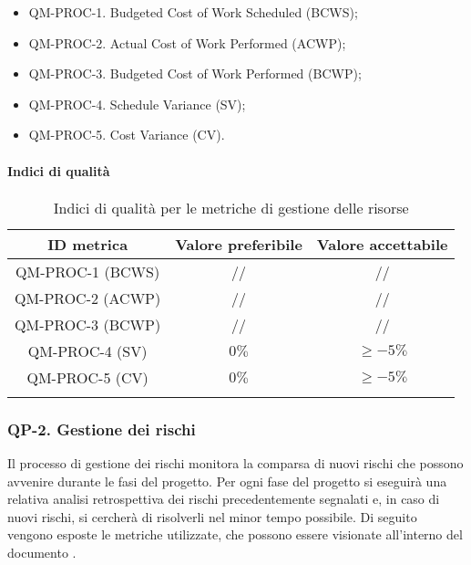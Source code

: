 			\begin{itemize}
				\item QM-PROC-1. Budgeted Cost of Work Scheduled (BCWS);
				\item QM-PROC-2. Actual Cost of Work Performed (ACWP);
				\item QM-PROC-3. Budgeted Cost of Work Performed (BCWP);
				\item QM-PROC-4. Schedule Variance (SV);
				\item QM-PROC-5. Cost Variance (CV).
			\end{itemize}

		\paragraph{Indici di qualità}

			\begin{center}
				\begin{longtable}{|c|c|c|}
				\hline
				\rowcolor{lighter-grayer}
				\textbf{ID metrica} & \textbf{Valore preferibile} & \textbf{Valore accettabile}\\
				\hline
				\endfirsthead
				\hline
				QM-PROC-1 (BCWS) & // & // \\
				\hline
				QM-PROC-2 (ACWP) & // & // \\
				\hline
				QM-PROC-3 (BCWP) & // & // \\
				\hline
				QM-PROC-4 (SV) & \(0\%\) & \(\ge -5\%\) \\
				\hline
				QM-PROC-5 (CV) & \(0\%\) & \(\ge -5\%\) \\
				\hline
				\caption{Indici di qualità per le metriche di gestione delle risorse}
				\end{longtable}
			\end{center}

	\subsubsection{QP-2. Gestione dei rischi}

		Il processo di gestione dei rischi monitora la comparsa di nuovi rischi che possono avvenire durante le fasi del progetto.
		Per ogni fase del progetto si eseguirà una relativa analisi retrospettiva dei rischi precedentemente segnalati e, in caso di nuovi rischi, si cercherà di risolverli nel minor tempo possibile.
		Di seguito vengono esposte le metriche utilizzate, che possono essere visionate all'interno del documento .


